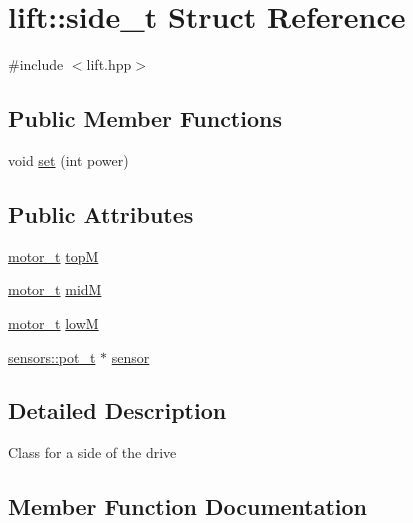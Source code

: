 \hypertarget{structlift_1_1side__t}{}\section{lift\+:\+:side\+\_\+t Struct Reference}
\label{structlift_1_1side__t}


{\ttfamily \#include $<$lift.\+hpp$>$}

\subsection*{Public Member Functions}
\begin{DoxyCompactItemize}
\item 
void \hyperlink{structlift_1_1side__t_af7e51af6ba1f15f1a522139e8c18f047}{set} (int power)
\end{DoxyCompactItemize}
\subsection*{Public Attributes}
\begin{DoxyCompactItemize}
\item 
\hyperlink{structmotor__t}{motor\+\_\+t} \hyperlink{structlift_1_1side__t_a98eccfefb378ed0a246a5f74a95f9020}{topM}
\item 
\hyperlink{structmotor__t}{motor\+\_\+t} \hyperlink{structlift_1_1side__t_a83c244448926521665e0f4d664b7b2b3}{midM}
\item 
\hyperlink{structmotor__t}{motor\+\_\+t} \hyperlink{structlift_1_1side__t_a9c945e15eea72e044cd3c5303b775059}{lowM}
\item 
\hyperlink{structsensors_1_1pot__t}{sensors\+::pot\+\_\+t} $\ast$ \hyperlink{structlift_1_1side__t_a8216f7c176f2fc4f17bc8f6ce6d53fcd}{sensor}
\end{DoxyCompactItemize}


\subsection{Detailed Description}
Class for a side of the drive 

\subsection{Member Function Documentation}
\mbox{\label{structlift_1_1side__t_af7e51af6ba1f15f1a522139e8c18f047}} 
